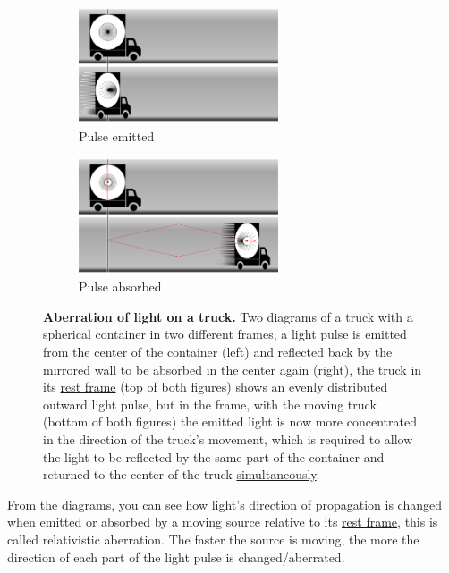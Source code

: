 \begin{figure}[htbp]
	\centering
	\begin{subfigure}{.49\textwidth}
		\centering
		\includegraphics[width = 5.9cm]{images/pdf/Aberrated_lorrys_1.pdf}
		\caption{Pulse emitted}
		\label{fig: truck aberrated 1}
	\end{subfigure}
	\begin{subfigure}{.49\textwidth}
		\centering
		\includegraphics[width = 5.9cm]{images/pdf/Aberrated_lorrys_2.pdf}
		\caption{Pulse absorbed}
		\label{fig: truck aberrated 2}
	\end{subfigure}
	\caption{\textbf{Aberration of light on a truck.} Two diagrams of a truck with a spherical container in two different frames, a light pulse is emitted from the center of the container (left) and reflected back by the mirrored wall to be absorbed in the center again (right), the truck in its \protect\hyperlink{def-proper-frame}{rest frame} (top of both figures) shows an evenly distributed outward light pulse, but in the frame, with the moving truck (bottom of both figures) the emitted light is now more concentrated in the direction of the truck's movement, which is required to allow the light to be reflected by the same part of the container and returned to the center of the truck \protect\hyperlink{def-simultaneity}{simultaneously}.}
	\label{fig: truck aberrated}
\end{figure}

%

From the diagrams, you can see how light's direction of propagation is changed when emitted or absorbed by a moving source relative to its \hyperlink{def-proper-frame}{rest frame}, this is called relativistic aberration. The faster the source is moving, the more the direction of each part of the light pulse is changed/aberrated.

